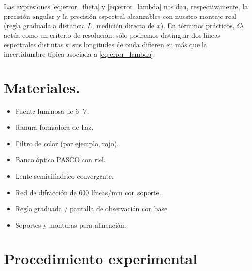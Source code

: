 \documentclass[11pt,twocolumn]{article}
\begin{document}
Las expresiones \eqref{eq:error_theta} y \eqref{eq:error_lambda} nos dan, respectivamente, la precisión angular y la precisión espectral alcanzables con nuestro montaje real (regla graduada a distancia $L$, medición directa de $x$). En términos prácticos, $\delta\lambda$ actúa como un criterio de resolución: sólo podremos distinguir dos líneas espectrales distintas si sus longitudes de onda difieren en más que la incertidumbre típica asociada a \eqref{eq:error_lambda}.


\section{Materiales.}

\begin{itemize}
    \item Fuente luminosa de \SI{6}{V}.
    \item Ranura formadora de haz.
    \item Filtro de color (por ejemplo, rojo).
    \item Banco óptico PASCO con riel.
    \item Lente semicilíndrico convergente.
    \item Red de difracción de 600 líneas/mm con soporte.
    \item Regla graduada / pantalla de observación con base.
    \item Soportes y monturas para alineación.
\end{itemize}

\section{Procedimiento experimental}
\end{document}
